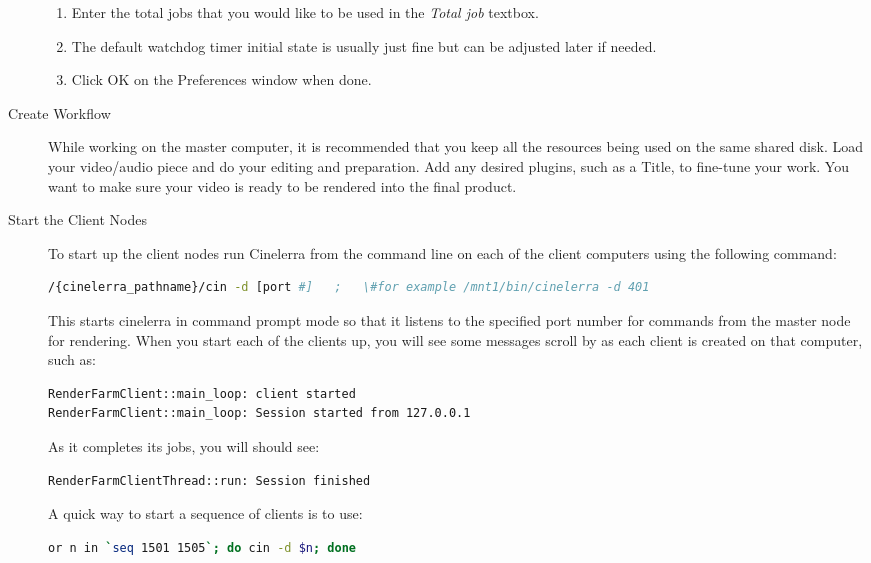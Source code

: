 \begin{description}
\begin{enumerate}
        \item Enter the total jobs that you would like to be used in the \textit{Total job} textbox.
        \item The default watchdog timer initial state is usually just fine but can be adjusted later if needed.
        \item Click OK on the Preferences window when done.
    \end{enumerate}
    \item[Create Workflow] While working on the master computer, it is recommended that you keep all the resources being used on the same shared disk.  Load your video/audio piece and do your editing and preparation.  Add any desired plugins, such as a Title, to fine-tune your work.  You want to make sure your video is ready to be rendered into the final product.
    \item[Start the Client Nodes] To start up the client nodes run Cinelerra from the command line on each of the client computers using the following command:
    \begin{lstlisting}[language=bash,numbers=none]
/{cinelerra_pathname}/cin -d [port #]   ;   \#for example /mnt1/bin/cinelerra -d 401
    \end{lstlisting}
    This starts cinelerra in command prompt mode so that it listens to the specified port number for commands from the master node for rendering.  When you start each of the clients up, you will see some messages scroll by as each client is created on that computer, such as:
    \begin{lstlisting}[language=bash,numbers=none]
RenderFarmClient::main_loop: client started
RenderFarmClient::main_loop: Session started from 127.0.0.1
    \end{lstlisting}
    As it completes its jobs, you will should see:
    \begin{lstlisting}[language=bash,numbers=none]
RenderFarmClientThread::run: Session finished
    \end{lstlisting}
    A quick way to start a sequence of clients is to use:
    \begin{lstlisting}[language=bash,numbers=none]
or n in `seq 1501 1505`; do cin -d $n; done
    \end{lstlisting}

\end{description}
